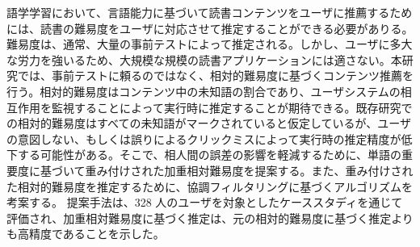 語学学習において、言語能力に基づいて読書コンテンツをユーザに推薦するためには、読書の難易度をユーザに対応させて推定することができる必要がありる。難易度は、通常、大量の事前テストによって推定される。しかし、ユーザに多大な労力を強いるため、大規模な規模の読書アプリケーションには適さない。本研究では、事前テストに頼るのではなく、相対的難易度に基づくコンテンツ推薦を行う。相対的難易度はコンテンツ中の未知語の割合であり、ユーザシステムの相互作用を監視することによって実行時に推定することが期待できる。既存研究での相対的難易度はすべての未知語がマークされていると仮定しているが、ユーザの意図しない、もしくは誤りによるクリックミスによって実行時の推定精度が低下する可能性がある。そこで、相人間の誤差の影響を軽減するために、単語の重要度に基づいて重み付けされた加重相対難易度を提案する。また、重み付けされた相対的難易度を推定するために、協調フィルタリングに基づくアルゴリズムを考案する。 提案手法は、328 人のユーザを対象としたケーススタディを通じて評価され、加重相対難易度に基づく推定は、元の相対的難易度に基づく推定よりも高精度であることを示した。
